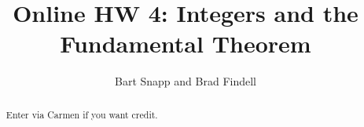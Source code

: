 \documentclass[handout,space,nooutcomes]{xourse}
\title{Online HW 4: Integers and the Fundamental Theorem}
\author{Bart Snapp and Brad Findell}
\begin{document}
\begin{abstract}
Enter via Carmen if you want credit.   
\end{abstract}
\maketitle

{}
\end{document}
